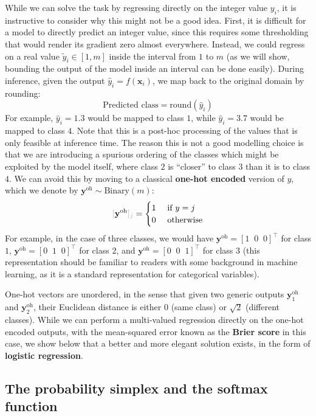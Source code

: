 While we can solve the task by regressing directly on the integer value $y_i$, it is instructive to consider why this might not be a good idea. First, it is difficult for a model to directly predict an integer value, since this requires some thresholding that would render its gradient zero almost everywhere. Instead, we could regress on a real value $\widetilde{y}_i \in \left[1, m\right]$ inside the interval from $1$ to $m$ (as we will show, bounding the output of the model inside an interval can be done easily). During inference, given the output $\hat{y}_i = f(\mathbf{x}_i)$, we map back to the original domain by rounding:
%
$$
\text{Predicted class} =\text{round}(\hat{y}_i)
$$
%
For example, $\hat{y}_i = 1.3$ would be mapped to class $1$, while $\hat{y}_i = 3.7$ would be mapped to class $4$. Note that this is a post-hoc processing of the values that is only feasible at inference time. The reason this is not a good modelling choice is that we are introducing a spurious ordering of the classes which might be exploited by the model itself, where class $2$ is “closer” to class $3$ than it is to class $4$. We can avoid this by moving to a classical \textbf{one-hot encoded} version of $y$, which we denote by $\mathbf{y}^{\text{oh}} \sim \text{Binary}(m)$:
%
$$
\idx{\mathbf{y}^{\text{oh}}}{j}=\begin{cases} 1 &\text{ if } y = j \\ 0 & \text{ otherwise} \end{cases}
$$
%
For example, in the case of three classes, we would have $\mathbf{y}^{\text{oh}} = \left[1 \;\; 0 \;\; 0 \right]^\top$ for class $1$, $\mathbf{y}^{\text{oh}} = \left[0 \;\; 1 \;\; 0 \right]^\top$ for class $2$, and $\mathbf{y}^{\text{oh}} = \left[0 \;\; 0 \;\; 1 \right]^\top$ for class $3$ (this representation should be familiar to readers with some background in machine learning, as it is a standard representation for categorical variables). 

One-hot vectors are unordered, in the sense that given two generic outputs $\mathbf{y}_1^{\text{oh}}$ and $\mathbf{y}_2^{\text{oh}}$, their Euclidean distance is either $0$ (same class) or $\sqrt{2}$ (different classes). While we can perform a multi-valued regression directly on the one-hot encoded outputs, with the mean-squared error known as the \textbf{Brier score} in this case, we show below that a better and more elegant solution exists, in the form of \textbf{logistic regression}.

\subsection{The probability simplex and the softmax function}
\label{sec:softmax}

